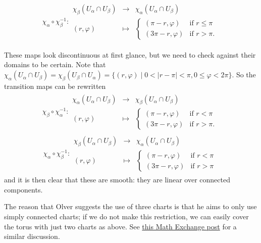 \documentclass[a4paper]{article}
\begin{document}
\begin{align}
    \chi_\alpha \circ \chi_\beta^{-1} : \begin{array}{rcl} \chi_\beta(U_\alpha \cap U_\beta) & \to & \chi_\alpha(U_\alpha \cap U_\beta) \\ (r, \varphi) & \mapsto & \left\{ \begin{array}{ll} (\pi - r, \varphi) & \text{if } r \leq \pi \\ (3\pi - r, \varphi) & \text{if } r > \pi. \end{array} \right. \end{array}
\end{align}

These maps look discontinuous at first glance, but we need to check against their domains to be certain. Note that $\chi_\alpha(U_\alpha \cap U_\beta) = \chi_\beta(U_\beta \cap U_\alpha) = \{(r, \varphi) \mid 0 < |r - \pi| < \pi, 0 \leq \varphi < 2\pi\}$. So the transition maps can be rewritten
\begin{align}
    \chi_\beta \circ \chi_\alpha^{-1} : \begin{array}{rcl} \chi_\alpha(U_\alpha \cap U_\beta) & \to & \chi_\beta(U_\alpha \cap U_\beta) \\ (r, \varphi) & \mapsto & \left\{ \begin{array}{ll} (\pi - r, \varphi) & \text{if } r < \pi \\ (3\pi - r, \varphi) & \text{if } r > \pi. \end{array} \right. \end{array}
\end{align}
\begin{align}
    \chi_\alpha \circ \chi_\beta^{-1} : \begin{array}{rcl} \chi_\beta(U_\alpha \cap U_\beta) & \to & \chi_\alpha(U_\alpha \cap U_\beta) \\ (r, \varphi) & \mapsto & \left\{ \begin{array}{ll} (\pi - r, \varphi) & \text{if } r < \pi \\ (3\pi - r, \varphi) & \text{if } r > \pi \end{array} \right. \end{array}
\end{align}
and it is then clear that these are smooth: they are linear over connected components.

The reason that Olver suggests the use of three charts is that he aims to only use simply connected charts; if we do not make this restriction, we can easily cover the torus with just two charts as above. See \href{https://math.stackexchange.com/a/2898114/921952}{this Math Exchange post} for a similar discussion.
\end{document}
